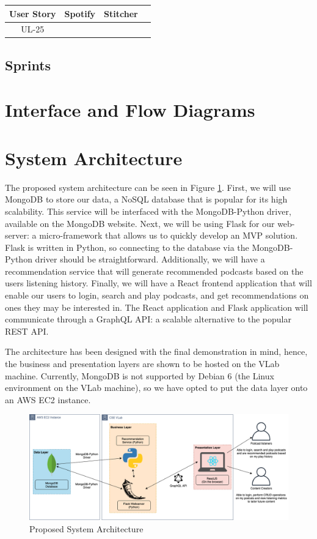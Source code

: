 \documentclass[12pt]{article}
\begin{document}

\begin{tabular}{|c||c|c|c}
    \hline
    User Story      & Spotify       & Stitcher      \\
    \hline
    UL-25           &               &               \\
\end{tabular}

\subsection{Sprints}

\section{Interface and Flow Diagrams}

\section{System Architecture}

The proposed system architecture can be seen in Figure \ref{fig:SysArch}.
First, we will use MongoDB to store our data, a NoSQL database that is popular for its high scalability.
This service will be interfaced with the MongoDB-Python driver, available on the MongoDB website.
Next, we will be using Flask for our web-server: a micro-framework that allows us to quickly develop an MVP solution.
Flask is written in Python, so connecting to the database via the MongoDB-Python driver should be straightforward.
Additionally, we will have a recommendation service that will generate recommended podcasts based on the users listening history.
Finally, we will have a React frontend application that will enable our users to login, search and play podcasts, and get recommendations on ones they may be interested in.
The React application and Flask application will communicate through a GraphQL API: a scalable alternative to the popular REST API.

The architecture has been designed with the final demonstration in mind, hence, the business and presentation layers are shown to be hosted on the VLab machine.
Currently, MongoDB is not supported by Debian 6 (the Linux environment on the VLab machine), so we have opted to put the data layer onto an AWS EC2 instance.

\begin{figure}[ht]
    \centering
    \includegraphics[width=\textwidth]{resources/SystemArchitecture}
    \caption{Proposed System Architecture}
    \label{fig:SysArch}
\end{figure}

\newpage


\end{document}
